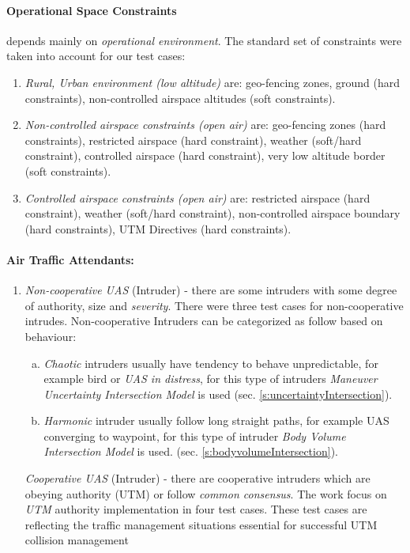 \paragraph{Operational Space Constraints} depends mainly on \emph{operational environment}.  The standard set of constraints were taken into account for our test cases:
\begin{enumerate}
    \item \emph{Rural, Urban environment (low altitude)} are: geo-fencing zones, ground (hard constraints), non-controlled airspace altitudes (soft constraints).
    
    \item \emph{Non-controlled airspace constraints (open air)} are: geo-fencing zones (hard constraints), restricted airspace (hard constraint), weather (soft/hard constraint), controlled airspace (hard constraint), very low altitude border (soft constraints).
    
    \item \emph{Controlled airspace constraints (open air)} are: restricted airspace (hard constraint), weather (soft/hard constraint), non-controlled airspace boundary (hard constraints), UTM Directives (hard constraints).
\end{enumerate}

\paragraph{Air Traffic Attendants:} 
\begin{enumerate}
    \item \emph{Non-cooperative UAS} (Intruder) -  there are some intruders with some degree of authority, size and \emph{severity}. There were three test cases for non-cooperative intrudes. Non-cooperative Intruders can be categorized as follow based on behaviour:
    \begin{enumerate}[a.]
        \item\emph{Chaotic} intruders usually have tendency to behave unpredictable, for example bird or \emph{UAS in distress}, for this type of intruders \emph{Maneuver Uncertainty  Intersection Model} is used (sec. \ref{s:uncertaintyIntersection}).
        
        \item\emph{Harmonic} intruder usually follow long straight paths, for example UAS converging to waypoint, for this type of intruder \emph{Body Volume Intersection Model} is used. (sec. \ref{s:bodyvolumeIntersection}).
    \end{enumerate}

    \emph{Cooperative UAS} (Intruder) -  there are cooperative intruders which are obeying authority (UTM) or follow \emph{common consensus}. The work focus on \emph{UTM} authority implementation in four test cases. These test cases are reflecting the traffic management situations essential for successful UTM collision management
\end{enumerate}
    
